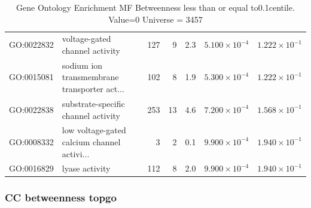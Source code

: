 \begin{table}[ht]
\begin{tabular}{llrrrrr}
  GO:0022832 & voltage-gated channel activity & 127 & 9 & 2.3 & $5.100 \times 10^{-4}$ & $1.222 \times 10^{-1}$ \\ 
  GO:0015081 & sodium ion transmembrane transporter act... & 102 & 8 & 1.9 & $5.300 \times 10^{-4}$ & $1.222 \times 10^{-1}$ \\ 
  GO:0022838 & substrate-specific channel activity & 253 & 13 & 4.6 & $7.200 \times 10^{-4}$ & $1.568 \times 10^{-1}$ \\ 
  GO:0008332 & low voltage-gated calcium channel activi... & 3 & 2 & 0.1 & $9.900 \times 10^{-4}$ & $1.940 \times 10^{-1}$ \\ 
  GO:0016829 & lyase activity & 112 & 8 & 2.0 & $9.900 \times 10^{-4}$ & $1.940 \times 10^{-1}$ \\ 
   \hline
\end{tabular}
\caption{Gene Ontology Enrichment MF Betweenness  less than or equal to0.1centile.   Value=0 Universe = 3457} 
\label{tab:Gene Ontology Enrichment MF Betweenness  less than or equal to0.1centile.   Value=0 Universe = 3457}
\end{table}

\subsubsection{CC betweenness topgo}

